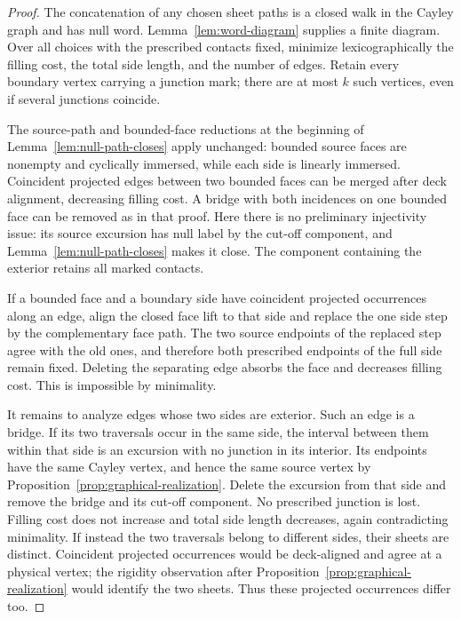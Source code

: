\begin{proof}
The concatenation of any chosen sheet paths is a closed walk in the
Cayley graph and has null word.  Lemma~\ref{lem:word-diagram} supplies a
finite diagram.  Over all choices with the prescribed contacts fixed,
minimize lexicographically the filling cost, the total side length, and
the number of edges.  Retain every boundary vertex carrying a junction
mark; there are at most $k$ such vertices, even if several junctions
coincide.

The source-path and bounded-face reductions at the beginning of
Lemma~\ref{lem:null-path-closes} apply unchanged: bounded source faces
are nonempty and cyclically immersed, while each side is linearly
immersed.  Coincident projected edges between two bounded faces can be
merged after deck alignment, decreasing filling cost.  A bridge with
both incidences on one bounded face can be removed as in that proof.
Here there is no preliminary injectivity issue: its source excursion
has null label by the cut-off component, and
Lemma~\ref{lem:null-path-closes} makes it close.  The component containing
the exterior retains all marked contacts.

If a bounded face and a boundary side have coincident projected
occurrences along an edge, align the closed face lift to that side and
replace the one side step by the complementary face path.  The two
source endpoints of the replaced step agree with the old ones, and
therefore both prescribed endpoints of the full side remain fixed.
Deleting the separating edge absorbs the face and decreases filling
cost.  This is impossible by minimality.

It remains to analyze edges whose two sides are exterior.  Such an edge
is a bridge.  If its two traversals occur in the same side, the interval
between them within that side is an excursion with no junction in its
interior.  Its endpoints have the same Cayley vertex, and hence the
same source vertex by Proposition~\ref{prop:graphical-realization}.
Delete the excursion from that side and remove the bridge and its
cut-off component.  No prescribed junction is lost.  Filling cost does
not increase and total side length decreases, again contradicting
minimality.  If instead the two traversals belong to different sides,
their sheets are distinct.  Coincident projected occurrences would be
deck-aligned and agree at a physical vertex; the rigidity observation
after Proposition~\ref{prop:graphical-realization} would identify the
two sheets.  Thus these projected occurrences differ too.


\end{proof}
